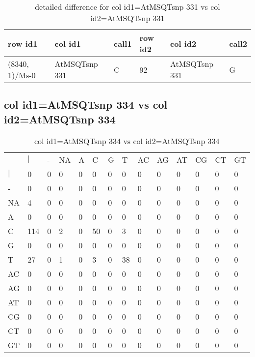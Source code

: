 \begin{center}
\begin{longtable}{|l|l|l|l|l|l|}
\caption{detailed difference for col id1=AtMSQTsnp 331 vs col id2=AtMSQTsnp 331} \label{table_dm665}\\
\hline
row id1&col id1&call1&row id2&col id2&call2\\
\hline
(8340, 1)/Ms-0&AtMSQTsnp 331&C&92&AtMSQTsnp 331&G\\
\hline
\end{longtable}
\end{center}

\subsection{col id1=AtMSQTsnp 334 vs col id2=AtMSQTsnp 334}
\begin{center}
\begin{longtable}{|l|l|l|l|l|l|l|l|l|l|l|l|l|l|}
\caption{col id1=AtMSQTsnp 334 vs col id2=AtMSQTsnp 334} \label{table_dm666}\\
\hline
\\
\hline
&$|$&-&NA&A&C&G&T&AC&AG&AT&CG&CT&GT\\
$|$&0&0&0&0&0&0&0&0&0&0&0&0&0\\
-&0&0&0&0&0&0&0&0&0&0&0&0&0\\
NA&4&0&0&0&0&0&0&0&0&0&0&0&0\\
A&0&0&0&0&0&0&0&0&0&0&0&0&0\\
C&114&0&2&0&50&0&3&0&0&0&0&0&0\\
G&0&0&0&0&0&0&0&0&0&0&0&0&0\\
T&27&0&1&0&3&0&38&0&0&0&0&0&0\\
AC&0&0&0&0&0&0&0&0&0&0&0&0&0\\
AG&0&0&0&0&0&0&0&0&0&0&0&0&0\\
AT&0&0&0&0&0&0&0&0&0&0&0&0&0\\
CG&0&0&0&0&0&0&0&0&0&0&0&0&0\\
CT&0&0&0&0&0&0&0&0&0&0&0&0&0\\
GT&0&0&0&0&0&0&0&0&0&0&0&0&0\\
\hline
\end{longtable}
\end{center}

